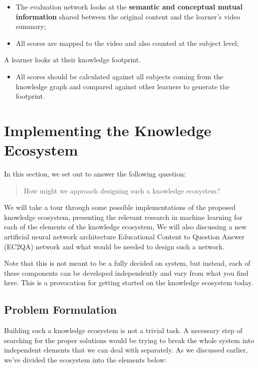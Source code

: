 \documentclass[]{book}
\providecommand{\tightlist}{%
  \setlength{\itemsep}{0pt}\setlength{\parskip}{0pt}}
\theoremstyle{definition}
\theoremstyle{definition}
\theoremstyle{definition}
\theoremstyle{remark}
\begin{document}
\begin{itemize}
\item
  The evaluation network looks at the \textbf{semantic and conceptual
  mutual information} shared between the original content and the
  learner's video summary;
\item
  All scores are mapped to the video and also counted at the subject
  level;
\end{itemize}

A learner looks at their knowledge footprint.

\begin{itemize}
\tightlist
\item
  All scores should be calculated against all subjects coming from the
  knowledge graph and compared against other learners to generate the
  footprint.
\end{itemize}

\chapter{Implementing the Knowledge
Ecosystem}\label{implementing-the-knowledge-ecosystem}

In this section, we set out to answer the following question:

\begin{quote}
How might we approach designing such a knowledge ecosystem?
\end{quote}

We will take a tour through some possible implementations of the
proposed knowledge ecosystem, presenting the relevant research in
machine learning for each of the elements of the knowledge ecosystem, We
will also discussing a new artificial neural network architecture
Educational Content to Question Answer (EC2QA) network and what would be
needed to design such a network.

Note that this is not meant to be a fully decided on system, but
instead, each of these components can be developed independently and
vary from what you find here. This is a provocation for getting started
on the knowledge ecosystem today.

\section{Problem Formulation}\label{problem-formulation}

Building such a knowledge ecosystem is not a trivial task. A necessary
step of searching for the proper solutions would be trying to break the
whole system into independent elements that we can deal with separately.
As we discussed earlier, we've divided the ecosystem into the elements
below:
\end{document}
